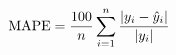 \documentclass[preview]{standalone}
\begin{document}
\begin{align*}
\special{dvisvgm:raw <g id='unique000'>}\text{MAPE} = \frac{100}{n}\sum_{i=1}^{n}\frac{|y_i - \hat{y}_i|}{|y_i|}\special{dvisvgm:raw </g>}
\end{align*}
\end{document}
